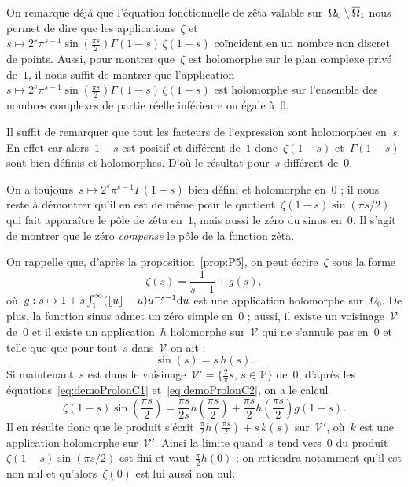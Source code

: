 		\begin{dem}
			On remarque déjà que l'équation fonctionnelle de zêta valable sur~$\Omega_0\setminus\overline{\Omega}_1$ nous permet de dire que les applications~$\zeta$ et~$s\mapsto2^s \pi^{s-1} \sin\left( \frac{\pi s}{2} \right) \Gamma(1-s)\, \zeta(1-s)$ coïncident en un nombre non discret de points. Aussi, pour montrer que~$\zeta$ est holomorphe sur le plan complexe privé de~$1$, il nous suffit de montrer que l'application~$s\mapsto 2^s \pi^{s-1} \sin\left( \frac{\pi s}{2} \right) \Gamma(1-s)\, \zeta(1-s)$ est holomorphe sur l'ensemble des nombres complexes de partie réelle inférieure ou égale à~$0$.

			Il suffit de remarquer que tout les facteurs de l'expression sont holomorphes en~$s$. En effet car alors~$1-s$ est positif et différent de~$1$ donc~$\zeta(1-s)$ et~$\Gamma(1-s)$ sont bien définis et holomorphes. D'où le résultat pour~$s$ différent de~$0$.
			
			On a toujours~$s\mapsto 2^s\pi^{s-1}\Gamma(1-s)$ bien défini et holomorphe en~$0$ ; il nous reste à démontrer qu'il en est de même pour le quotient~$\zeta(1-s)\sin(\pi s/2)$ qui fait apparaître le pôle de zêta en~$1$, mais aussi le zéro du sinus en~$0$. Il s'agit de montrer que le zéro \emph{compense} le pôle de la fonction zêta.
			
			On rappelle que, d'après la proposition~\ref{prop:P5}, on peut écrire~$\zeta$ sous la forme
			\begin{equation}\label{eq:demoProlonC1}
				\zeta(s) = \frac{1}{s-1} + g(s),
			\end{equation}
			où~$g:s\mapsto1+s\int_{1}^{\infty}(\lfloor u\rfloor-u)u^{-s-1}\mathrm{d}u$ est une application holomorphe sur~$\Omega_0$. De plus, la fonction sinus admet un zéro simple en~$0$ ; aussi, il existe un voisinage~$\mathcal{V}$ de~$0$ et il existe un application~$h$ holomorphe sur~$\mathcal{V}$ qui ne s'annule pas en~$0$ et telle que que pour tout~$s$ dans~$\mathcal{V}$ on ait :
			\begin{equation}\label{eq:demoProlonC2}
				\sin(s) = s\,h(s).
			\end{equation}
			Si maintenant~$s$ est dans le voisinage~$\mathcal{V}' = \{\frac{2}{\pi}s,\,s\in\mathcal{V}\}$ de~$0$, d'après les équations~\eqref{eq:demoProlonC1} et~\eqref{eq:demoProlonC2}, on a le calcul
			\[
				\zeta(1-s)\sin\left(\frac{\pi s }{2}\right) = \frac{\pi s }{2s}h\left(\frac{\pi s}{2}\right) + \frac{\pi s}{2}h\left(\frac{\pi s}{2}\right)g(1-s).
			\]
			Il en résulte donc que le produit s'écrit~$\frac{\pi}{2}h(\frac{\pi s}{2}) + s\,k(s)$ sur~$\mathcal{V}'$, où~$k$ est une application holomorphe sur~$\mathcal{V}'$. Ainsi la limite quand~$s$ tend vers~$0$ du produit~$\zeta(1-s)\sin(\pi s/2)$ est fini et vaut~$\frac{\pi}{2}h(0)$ ; on retiendra notamment qu'il est non nul et qu'alors~$\zeta(0)$ est lui aussi non nul.
			

\end{dem}

